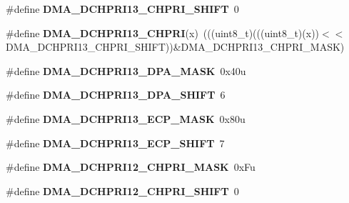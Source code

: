 \begin{DoxyCompactItemize}
\item 
\#define {\bfseries D\+M\+A\+\_\+\+D\+C\+H\+P\+R\+I13\+\_\+\+C\+H\+P\+R\+I\+\_\+\+S\+H\+I\+FT}~0\hypertarget{group__DMA__Register__Masks_ga71e8be2fe53b3e57287a73d382467140}{}\label{group__DMA__Register__Masks_ga71e8be2fe53b3e57287a73d382467140}

\item 
\#define {\bfseries D\+M\+A\+\_\+\+D\+C\+H\+P\+R\+I13\+\_\+\+C\+H\+P\+RI}(x)~(((uint8\+\_\+t)(((uint8\+\_\+t)(x))$<$$<$D\+M\+A\+\_\+\+D\+C\+H\+P\+R\+I13\+\_\+\+C\+H\+P\+R\+I\+\_\+\+S\+H\+I\+FT))\&D\+M\+A\+\_\+\+D\+C\+H\+P\+R\+I13\+\_\+\+C\+H\+P\+R\+I\+\_\+\+M\+A\+SK)\hypertarget{group__DMA__Register__Masks_gab1db4316293e7eda20fa296e51681172}{}\label{group__DMA__Register__Masks_gab1db4316293e7eda20fa296e51681172}

\item 
\#define {\bfseries D\+M\+A\+\_\+\+D\+C\+H\+P\+R\+I13\+\_\+\+D\+P\+A\+\_\+\+M\+A\+SK}~0x40u\hypertarget{group__DMA__Register__Masks_ga7d0dba9a621669e28a8c6c557d962502}{}\label{group__DMA__Register__Masks_ga7d0dba9a621669e28a8c6c557d962502}

\item 
\#define {\bfseries D\+M\+A\+\_\+\+D\+C\+H\+P\+R\+I13\+\_\+\+D\+P\+A\+\_\+\+S\+H\+I\+FT}~6\hypertarget{group__DMA__Register__Masks_ga94fae69ff7774aa7d1f24fd8b2387a40}{}\label{group__DMA__Register__Masks_ga94fae69ff7774aa7d1f24fd8b2387a40}

\item 
\#define {\bfseries D\+M\+A\+\_\+\+D\+C\+H\+P\+R\+I13\+\_\+\+E\+C\+P\+\_\+\+M\+A\+SK}~0x80u\hypertarget{group__DMA__Register__Masks_ga74ad97c0ca8dfdd5152b2db375389908}{}\label{group__DMA__Register__Masks_ga74ad97c0ca8dfdd5152b2db375389908}

\item 
\#define {\bfseries D\+M\+A\+\_\+\+D\+C\+H\+P\+R\+I13\+\_\+\+E\+C\+P\+\_\+\+S\+H\+I\+FT}~7\hypertarget{group__DMA__Register__Masks_ga462e7c666fbe9d355893654f7fe52cd9}{}\label{group__DMA__Register__Masks_ga462e7c666fbe9d355893654f7fe52cd9}

\item 
\#define {\bfseries D\+M\+A\+\_\+\+D\+C\+H\+P\+R\+I12\+\_\+\+C\+H\+P\+R\+I\+\_\+\+M\+A\+SK}~0x\+Fu\hypertarget{group__DMA__Register__Masks_gae4a41c199e83720c8912622f921f3993}{}\label{group__DMA__Register__Masks_gae4a41c199e83720c8912622f921f3993}

\item 
\#define {\bfseries D\+M\+A\+\_\+\+D\+C\+H\+P\+R\+I12\+\_\+\+C\+H\+P\+R\+I\+\_\+\+S\+H\+I\+FT}~0\hypertarget{group__DMA__Register__Masks_ga463e67297f7a0d3b1c7c6799ac90fb15}{}\label{group__DMA__Register__Masks_ga463e67297f7a0d3b1c7c6799ac90fb15}


\end{DoxyCompactItemize}
